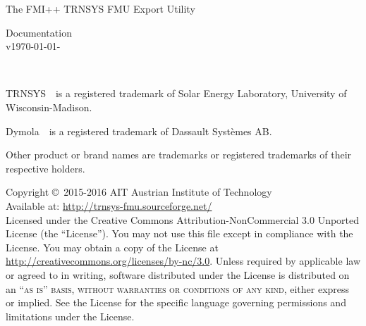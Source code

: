 \documentclass[11pt,fleqn,oneside,openany]{book} %
\newcommand{\versionsep}{-}
\newcommand{\fmipp}{FMI++\xspace}
\newcommand{\trnsys}{TRNSYS\xspace}
\begin{document}

\begingroup
\thispagestyle{empty}
\centering
\vspace*{9.35cm}
\par\normalfont\fontsize{29}{30}\sffamily\selectfont
The \fmipp \trnsys FMU Export Utility\par %
\vspace*{0.5cm}
{\huge Documentation}\\[5pt]
{\normalsize v\yyyymmdddate\today\versionsep\currenttime}\par %
\endgroup


\newpage
~\vfill
\thispagestyle{empty}

\noindent \trnsys~\textregistered~is a registered trademark of Solar Energy Laboratory, University of Wisconsin-Madison.

\noindent Dymola~\textregistered~is a registered trademark of Dassault Syst\`emes AB.

\noindent Other product or brand names are trademarks or registered trademarks of their respective holders.

\vspace*{2cm}

\noindent Copyright \copyright\ 2015-2016 AIT Austrian Institute of Technology\\ %


\noindent Available at: \url{http://trnsys-fmu.sourceforge.net/}\\ %

\noindent Licensed under the Creative Commons Attribution-NonCommercial 3.0 Unported License (the ``License''). You may not use this file except in compliance with the License. You may obtain a copy of the License at \url{http://creativecommons.org/licenses/by-nc/3.0}. Unless required by applicable law or agreed to in writing, software distributed under the License is distributed on an \textsc{``as is'' basis, without warranties or conditions of any kind}, either express or implied. See the License for the specific language governing permissions and limitations under the License.\\ %
\end{document}
